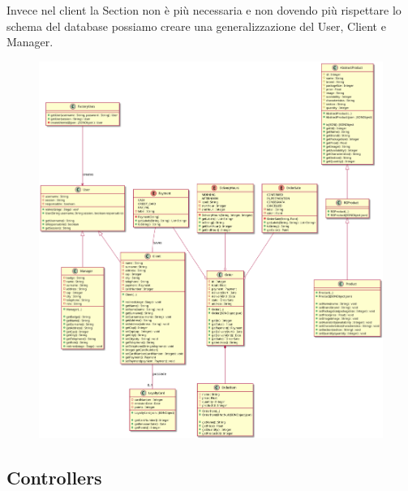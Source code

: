 \documentclass[12pt, a4paper]{article}
\begin{document}
Invece nel client la Section non è più necessaria e non dovendo più rispettare lo
schema del database possiamo creare una generalizzazione del User, Client e Manager.

\begin{figure}[H]
\centering
\includegraphics[width=\linewidth]{client_models_class.png}

\end{figure}


\subsection{Controllers}
\end{document}
